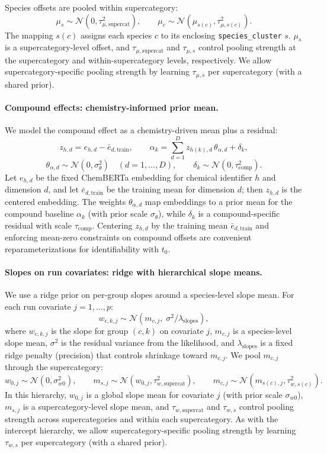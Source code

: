 \documentclass[11pt]{article}
\begin{document}
Species offsets are pooled within supercategory:
\[
  \mu_s \sim \mathcal{N}(0,\tau_{\mu,\mathrm{supercat}}^2), \qquad
  \mu_c \sim \mathcal{N}\!\left(\mu_{s(c)}, \tau_{\mu,s(c)}^2\right).
\]
The mapping $s(c)$ assigns each species $c$ to its enclosing \texttt{species\_cluster} $s$. $\mu_s$ is a supercategory-level
offset, and $\tau_{\mu,\mathrm{supercat}}$ and $\tau_{\mu,s}$ control pooling strength at the supercategory and
within-supercategory levels, respectively.
We allow supercategory-specific pooling strength by learning $\tau_{\mu,s}$ per supercategory (with a shared prior).

\paragraph{Compound effects: chemistry-informed prior mean.}
We model the compound effect as a chemistry-driven mean plus a residual:
\[
  z_{h,d} = e_{h,d} - \bar{e}_{d,\text{train}}, \qquad
  \alpha_k = \sum_{d=1}^{D} z_{h(k),d}\,\theta_{\alpha,d} + \delta_k,
\]
\[
  \theta_{\alpha,d} \sim \mathcal{N}(0, \sigma_\theta^2)\quad(d=1,\ldots,D), \qquad
  \delta_k \sim \mathcal{N}(0,\tau_{\mathrm{comp}}^2).
\]
Let $e_{h,d}$ be the fixed ChemBERTa embedding for chemical identifier $h$ and dimension $d$, and let $\bar{e}_{d,\text{train}}$
be the training mean for dimension $d$; then $z_{h,d}$ is the centered embedding. The weights $\theta_{\alpha,d}$ map
embeddings to a prior mean for the compound baseline $\alpha_k$ (with prior scale $\sigma_\theta$), while $\delta_k$ is a
compound-specific residual with scale $\tau_{\mathrm{comp}}$.
Centering $z_{h,d}$ by the training mean $\bar{e}_{d,\text{train}}$ and enforcing mean-zero constraints on compound
offsets are convenient reparameterizations for identifiability with $t_0$.

\paragraph{Slopes on run covariates: ridge with hierarchical slope means.}
We use a ridge prior on per-group slopes around a species-level slope mean. For each run covariate $j=1,\ldots,p$:
\[
  w_{c,k,j} \sim \mathcal{N}\!\left(m_{c,j},\; \sigma^2/\lambda_{\mathrm{slopes}}\right),
\]
where $w_{c,k,j}$ is the slope for group $(c,k)$ on covariate $j$, $m_{c,j}$ is a species-level slope mean, $\sigma^2$ is
the residual variance from the likelihood, and $\lambda_{\mathrm{slopes}}$ is a fixed ridge penalty (precision) that
controls shrinkage toward $m_{c,j}$. We pool $m_{c,j}$ through the supercategory:
\[
  w_{0,j} \sim \mathcal{N}(0, \sigma_{w0}^2), \qquad
  m_{s,j} \sim \mathcal{N}(w_{0,j},\tau_{w,\mathrm{supercat}}^2), \qquad
  m_{c,j} \sim \mathcal{N}(m_{s(c),j},\tau_{w,s(c)}^2).
\]
In this hierarchy, $w_{0,j}$ is a global slope mean for covariate $j$ (with prior scale $\sigma_{w0}$), $m_{s,j}$ is a
supercategory-level slope mean, and $\tau_{w,\mathrm{supercat}}$ and $\tau_{w,s}$ control pooling strength across
supercategories and within each supercategory.
As with the intercept hierarchy, we allow supercategory-specific pooling strength by learning $\tau_{w,s}$ per
supercategory (with a shared prior).
\end{document}
